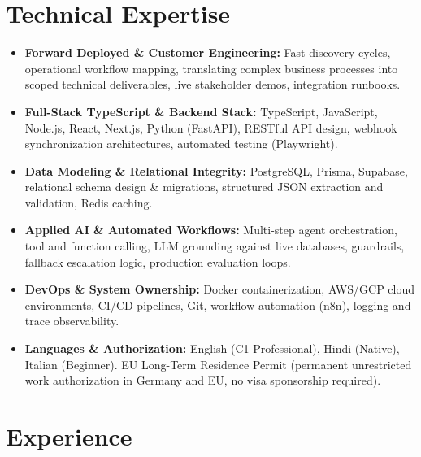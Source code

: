 \documentclass[10pt,a4paper]{article}
\begin{document}
\section{Technical Expertise}
\begin{itemize}
  \item \textbf{Forward Deployed \& Customer Engineering:} Fast discovery cycles, operational workflow mapping, translating complex business processes into scoped technical deliverables, live stakeholder demos, integration runbooks.
  \item \textbf{Full-Stack TypeScript \& Backend Stack:} TypeScript, JavaScript, Node.js, React, Next.js, Python (FastAPI), RESTful API design, webhook synchronization architectures, automated testing (Playwright).
  \item \textbf{Data Modeling \& Relational Integrity:} PostgreSQL, Prisma, Supabase, relational schema design \& migrations, structured JSON extraction and validation, Redis caching.
  \item \textbf{Applied AI \& Automated Workflows:} Multi-step agent orchestration, tool and function calling, LLM grounding against live databases, guardrails, fallback escalation logic, production evaluation loops.
  \item \textbf{DevOps \& System Ownership:} Docker containerization, AWS/GCP cloud environments, CI/CD pipelines, Git, workflow automation (n8n), logging and trace observability.
  \item \textbf{Languages \& Authorization:} English (C1 Professional), Hindi (Native), Italian (Beginner). EU Long-Term Residence Permit (permanent unrestricted work authorization in Germany and EU, no visa sponsorship required).
\end{itemize}

\section{Experience}
\end{document}
